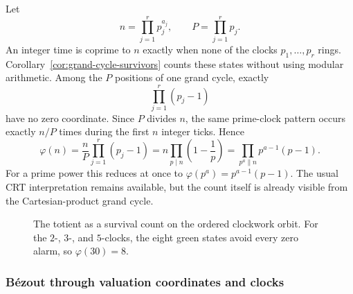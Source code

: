 \documentclass[11pt,a4paper]{article}
\theoremstyle{clockplain}
\theoremstyle{definition}
\theoremstyle{remark}
\begin{document}
Let
\[
n=\prod_{j=1}^{r}p_j^{a_j},
\qquad
P=\prod_{j=1}^{r}p_j.
\]
An integer time is coprime to $n$ exactly when none of the clocks $p_1,\ldots,p_r$ rings.  Corollary~\ref{cor:grand-cycle-survivors} counts these states without using modular arithmetic. Among the $P$ positions of one grand cycle, exactly
\[
\prod_{j=1}^{r}(p_j-1)
\]
have no zero coordinate.  Since $P$ divides $n$, the same prime-clock pattern occurs exactly $n/P$ times during the first $n$ integer ticks.  Hence
\begin{equation}
\boxed{\varphi(n)=\frac{n}{P}\prod_{j=1}^{r}(p_j-1)
      =n\prod_{p\mid n}\left(1-\frac1p\right)
      =\prod_{p^a\parallel n}p^{a-1}(p-1).}
\label{eq:totient}
\end{equation}
For a prime power this reduces at once to $\varphi(p^a)=p^{a-1}(p-1)$.  The usual CRT interpretation remains available, but the count itself is already visible from the Cartesian-product grand cycle.

\begin{figure}[ht]
\centering
{}
\caption{The totient as a survival count on the ordered clockwork orbit. For the $2$-, $3$-, and $5$-clocks, the eight green states avoid every zero alarm, so $\varphi(30)=8$.}
\label{fig:totient}
\end{figure}

\subsubsection{B\'ezout through valuation coordinates and clocks}
\end{document}
